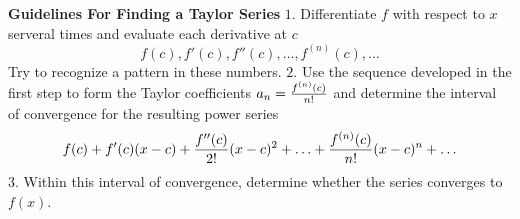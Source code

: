 \nopagenumbers
{\bf Guidelines For Finding a Taylor Series}
\vskip 6pt
$1.$ Differentiate $f$ with respect to $x$ serveral times and evaluate each derivative at $c$
$$f(c),f'(c),f''(c),\ldots,f^{(n)}(c),\ldots$$ Try to recognize a pattern in these numbers.
\vskip 1mm
$2.$ Use the sequence developed in the first step to form the Taylor coefficients $a_n={f^{(n)}(c)\over n!}$ and determine the interval of convergence for the resulting power series $$f(c)+f'(c)(x-c)+{f''(c)\over 2!}(x-c)^2+\ldots+{f^{(n)}(c)\over n!}(x-c)^n+\ldots$$
\vskip 1mm
$3.$ Within this interval of convergence, determine whether the series converges to $f(x)$.


\vfill\eject
